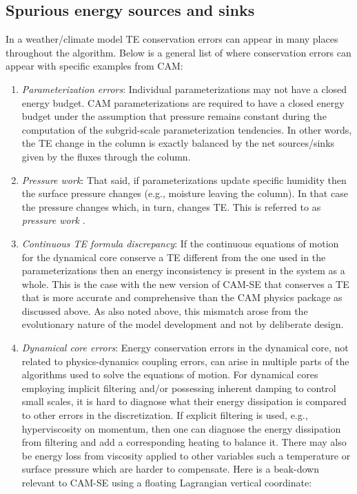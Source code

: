 \documentclass{agujournal}
\begin{document}
\subsection{Spurious energy sources and sinks}\label{subsec:spuriousE}
In a weather/climate model TE conservation errors can appear in many places throughout the algorithm. Below is a general list of where conservation errors can appear with specific examples from CAM:
\begin{enumerate}
\item {\em{Parameterization errors}}: Individual parameterizations may not have a closed energy budget. CAM parameterizations are required to have a closed energy budget under the assumption that pressure remains constant during the computation of the subgrid-scale parameterization tendencies. In other words, the TE change in the column is exactly balanced by the net sources/sinks given by the fluxes through the column. 
\item {\em{Pressure work}}: That said, if parameterizations update specific humidity then the surface pressure changes (e.g., moisture leaving the column). In that case the pressure changes which, in turn, changes TE. This is referred to as {\em{pressure work}} \citep[section 3.1.8 in ][]{CAM5}.
\item {\em{Continuous TE formula discrepancy}}:  If the continuous equations of motion for the dynamical core conserve a TE different from the one used in the parameterizations then an energy inconsistency is present in the system as a whole. This is the case with the new version of CAM-SE that conserves a TE that is more accurate and comprehensive than the CAM physics package as discussed above. As also noted above, this mismatch arose from the evolutionary nature of the model development and not by deliberate design.
\item {\em{Dynamical core errors}}: Energy conservation errors in the dynamical core, not related to physics-dynamics coupling errors, can arise in multiple parts of the algorithms used to solve the equations of motion. For dynamical cores employing implicit filtering \citep[e.g., limiters in flux operators ][]{L2004MWR} and/or possessing inherent damping to control small scales, it is hard to diagnose what their energy dissipation is compared to other errors in the discretization. If explicit filtering is used, e.g., hyperviscosity on momentum, then one can diagnose the energy dissipation from filtering and add a corresponding heating to balance it. There may also be energy loss from viscosity applied to other variables such a temperature or surface pressure which are harder to compensate. Here is a beak-down relevant to CAM-SE using a floating Lagrangian vertical coordinate:

\end{enumerate}
\end{document}
